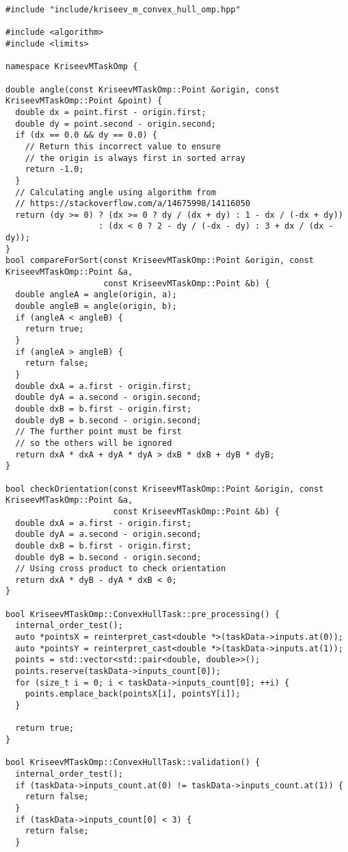 \documentclass[a4paper]{article}
\begin{document}
\begin{lstlisting}
#include "include/kriseev_m_convex_hull_omp.hpp"

#include <algorithm>
#include <limits>

namespace KriseevMTaskOmp {

double angle(const KriseevMTaskOmp::Point &origin, const KriseevMTaskOmp::Point &point) {
  double dx = point.first - origin.first;
  double dy = point.second - origin.second;
  if (dx == 0.0 && dy == 0.0) {
    // Return this incorrect value to ensure
    // the origin is always first in sorted array
    return -1.0;
  }
  // Calculating angle using algorithm from
  // https://stackoverflow.com/a/14675998/14116050
  return (dy >= 0) ? (dx >= 0 ? dy / (dx + dy) : 1 - dx / (-dx + dy))
                   : (dx < 0 ? 2 - dy / (-dx - dy) : 3 + dx / (dx - dy));
}
bool compareForSort(const KriseevMTaskOmp::Point &origin, const KriseevMTaskOmp::Point &a,
                    const KriseevMTaskOmp::Point &b) {
  double angleA = angle(origin, a);
  double angleB = angle(origin, b);
  if (angleA < angleB) {
    return true;
  }
  if (angleA > angleB) {
    return false;
  }
  double dxA = a.first - origin.first;
  double dyA = a.second - origin.second;
  double dxB = b.first - origin.first;
  double dyB = b.second - origin.second;
  // The further point must be first
  // so the others will be ignored
  return dxA * dxA + dyA * dyA > dxB * dxB + dyB * dyB;
}

bool checkOrientation(const KriseevMTaskOmp::Point &origin, const KriseevMTaskOmp::Point &a,
                      const KriseevMTaskOmp::Point &b) {
  double dxA = a.first - origin.first;
  double dyA = a.second - origin.second;
  double dxB = b.first - origin.first;
  double dyB = b.second - origin.second;
  // Using cross product to check orientation
  return dxA * dyB - dyA * dxB < 0;
}

bool KriseevMTaskOmp::ConvexHullTask::pre_processing() {
  internal_order_test();
  auto *pointsX = reinterpret_cast<double *>(taskData->inputs.at(0));
  auto *pointsY = reinterpret_cast<double *>(taskData->inputs.at(1));
  points = std::vector<std::pair<double, double>>();
  points.reserve(taskData->inputs_count[0]);
  for (size_t i = 0; i < taskData->inputs_count[0]; ++i) {
    points.emplace_back(pointsX[i], pointsY[i]);
  }

  return true;
}

bool KriseevMTaskOmp::ConvexHullTask::validation() {
  internal_order_test();
  if (taskData->inputs_count.at(0) != taskData->inputs_count.at(1)) {
    return false;
  }
  if (taskData->inputs_count[0] < 3) {
    return false;
  }


\end{lstlisting}
\end{document}
